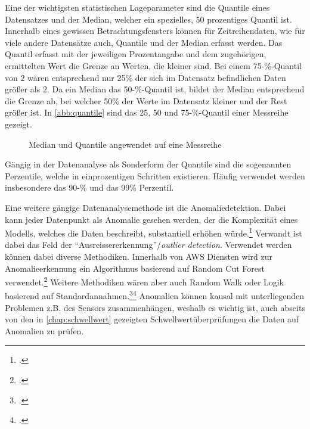 Eine der wichtigsten statistischen Lageparameter sind die Quantile eines Datensatzes und der Median, welcher ein spezielles, 50 prozentiges Quantil ist. 
Innerhalb eines gewissen Betrachtungsfensters können für Zeitreihendaten, wie für viele andere Datensätze auch, Quantile und der Median erfasst werden. 
Das Quantil erfasst mit der jeweiligen Prozentangabe und dem zugehörigen, ermittelten Wert die Grenze an Werten, die kleiner sind. 
Bei einem 75-\%-Quantil von $2$ wären entsprechend nur 25\% der sich im Datensatz befindlichen Daten größer als $2$. 
Da ein Median das 50-\%-Quantil ist, bildet der Median entsprechend die Grenze ab, bei welcher 50\% der Werte im Datensatz kleiner und der Rest größer ist. In \autoref{abb:quantile} sind das 25, 50 und 75-\%-Quantil einer Messreihe gezeigt.
\begin{figure}[H]
\centering
{}
\caption{Median und Quantile angewendet auf eine Messreihe}
\label{abb:quantile}
\end{figure}

Gängig in der Datenanalyse als Sonderform der Quantile sind die sogenannten Perzentile, welche in einprozentigen Schritten existieren. Häufig verwendet werden insbesondere das 90-\% und das 99\% Perzentil.

Eine weitere gängige Datenanalysemethode ist die Anomaliedetektion. 
Dabei kann jeder Datenpunkt als Anomalie gesehen werden, der die Komplexität eines Modells, welches die Daten beschreibt, substantiell erhöhen würde.\footcite[Vgl.][]{Guha.2016} Verwandt ist dabei das Feld der \enquote{Ausreissererkennung}/\textit{outlier detection}. 
Verwendet werden können dabei diverse Methodiken. Innerhalb von \ac{AWS} Diensten wird zur Anomalieerkennung ein Algorithmus basierend auf Random Cut Forest verwendet.\footcite[Vgl.][1]{Guha.2016} Weitere Methodiken wären aber auch Random Walk oder Logik basierend auf Standardannahmen.\footcite[Vgl.][]{Moonesinghe.2006}\nzitat\footcite[Vgl.][]{Angiulli.2008} Anomalien können kausal mit unterliegenden Problemen z.B. des Sensors zusammenhängen, weshalb es wichtig ist, auch abseits von den in \autoref{chap:schwellwert} gezeigten Schwellwertüberprüfungen die Daten auf Anomalien zu prüfen.

